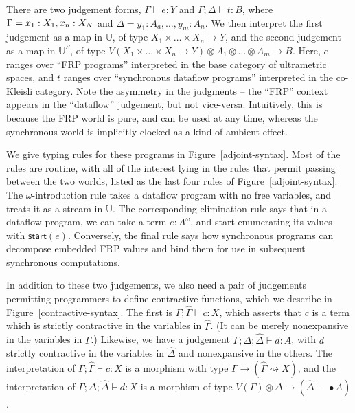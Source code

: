 \documentclass[nocopyrightspace,preprint]{sigplanconf}
\newcommand{\ultrametric}{\mathbb{U}}
\newcommand{\shrink}{\rightsquigarrow}
\newcommand{\Start}[1]{\mathsf{start}(#1)}
\newcommand{\lollishrink}{-\!\!\!\,\bullet}
\newcommand{\judgeu}[3]{{#1} \vdash {#2} : {#3}}
\newcommand{\judgek}[4][\Gamma]{{#1};{#2} \vdash {#3} : {#4}}
\newcommand{\judgec}[4][\Gamma]{{#1};{#2} \vdash {#3} : {#4}}
\newcommand{\judgekc}[4][\Delta]{\Gamma;{#1};{#2} \vdash {#3} : {#4}}
\begin{document}
There are two judgement forms, $\judgeu{\Gamma}{e}{Y}$ and
$\judgek{\Delta}{t}{B}$, where $\Gamma = x_1:X_1,\label,x_n:X_N$ and
$\Delta = y_1:A_a, \ldots, y_m:A_n$.  We then interpret the first
judgement as a map in $\ultrametric$, of type $X_1 \times \ldots
\times X_n \to Y$, and the second judgement as a map in
$\ultrametric^S$, of type $V(X_1 \times \ldots \times X_n \to Y)
\otimes A_1 \otimes \ldots \otimes A_m \to B$. Here, $e$ ranges over
``FRP programs'' interpreted in the base category of ultrametric
spaces, and $t$ ranges over ``synchronous dataflow programs''
interpreted in the co-Kleisli category. Note the asymmetry in 
the judgments -- the ``FRP'' context appears in the ``dataflow''
judgement, but not vice-versa. Intuitively, this is because the FRP
world is pure, and can be used at any time, whereas the synchronous
world is implicitly clocked as a kind of ambient effect. 

We give typing rules for these programs in
Figure~\ref{adjoint-syntax}.  Most of the rules are routine, with all
of the interest lying in the rules that permit passing between the two
worlds, listed as the last four rules of
Figure~\ref{adjoint-syntax}. The $\omega$-introduction rule takes a
dataflow program with no free variables, and treats it as a stream in
$\ultrametric$. The corresponding elimination rule says that in a
dataflow program, we can take a term $e : A^\omega$, and start
enumerating its values with $\Start{e}$. Conversely, the final rule
says how synchronous programs can decompose embedded FRP values
and bind them for use in subsequent synchronous computations.

In addition to these two judgements, we also need a pair of judgements
permitting programmers to define contractive functions, which we
describe in Figure~\ref{contractive-syntax}. The first is
$\judgec{\hat{\Gamma}}{c}{X}$, which asserts that $c$ is a term which
is strictly contractive in the variables in $\hat{\Gamma}$.  (It can
be merely nonexpansive in the variables in $\Gamma$.) Likewise, we
have a judgement $\judgekc{\hat{\Delta}}{d}{A}$, with $d$ 
strictly contractive in the variables in $\hat{\Delta}$ and
nonexpansive in the others. The interpretation of
$\judgec{\hat{\Gamma}}{c}{X}$ is a morphism with type $\Gamma \to
(\hat{\Gamma} \shrink X)$, and the interpretation of
$\judgekc{\hat{\Delta}}{d}{X}$ is a morphism of type $V(\Gamma)
\otimes \Delta \to (\hat{\Delta} \lollishrink A)$.  
\end{document}
